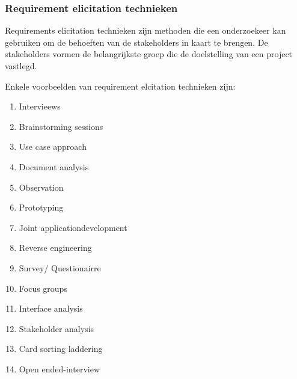 \subsubsection{Requirement elicitation technieken}

Requirements elicitation technieken zijn methoden die een onderzoekeer kan gebruiken om de behoeften van de stakeholders in kaart te brengen. De stakeholders  vormen de belangrijkste groep die de doelstelling van een project vastlegd.

Enkele voorbeelden van requirement elcitation technieken zijn:


\begin{enumerate}
	\item  Intervieews
	\item  Brainstorming sessions 
	\item  Use case approach 
	\item  Document analysis 
	\item  Observation
	\item  Prototyping
	\item  Joint applicationdevelopment
	\item  Reverse engineering 
	\item  Survey/ Questionairre 
	\item  Focus groups 
	\item  Interface analysis
	\item  Stakeholder analysis 
	\item  Card sorting laddering 
	\item  Open ended-interview
\end{enumerate}






\usepackage{pgf}





